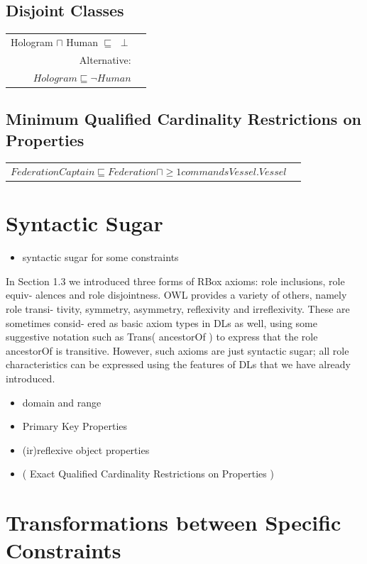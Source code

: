 \documentclass{llncs}
\newenvironment{DL}{
	\begin{center}
  \begin{tabular}{r l}

}{
  \end{tabular}
	\end{center}
}
\begin{document}
\subsection{Disjoint Classes}

\begin{DL}
Hologram $\sqcap$ Human $\sqsubseteq$ $\perp$\\
Alternative:\\
$Hologram \sqsubseteq \neg Human$
\end{DL}

\subsection{Minimum Qualified Cardinality Restrictions on Properties}

\begin{DL}
$FederationCaptain \sqsubseteq Federation \sqcap \geq1 commandsVessel . Vessel $
\end{DL}

\section{Syntactic Sugar}

\begin{itemize}
	\item syntactic sugar for some constraints
\end{itemize}

In Section 1.3 we introduced three forms of RBox axioms: role inclusions, role equiv-
alences and role disjointness. OWL provides a variety of others, namely role transi-
tivity, symmetry, asymmetry, reflexivity and irreflexivity. These are sometimes consid-
ered as basic axiom types in DLs as well, using some suggestive notation such as
Trans( ancestorOf ) to express that the role ancestorOf is transitive. However, such axioms
are just syntactic sugar; all role characteristics can be expressed using the features
of DLs that we have already introduced.

\begin{itemize}
  \item domain and range
	\item Primary Key Properties
	\item (ir)reflexive object properties
	\item ( Exact Qualified Cardinality Restrictions on Properties )
\end{itemize}

\section{Transformations between Specific Constraints}
\end{document}
